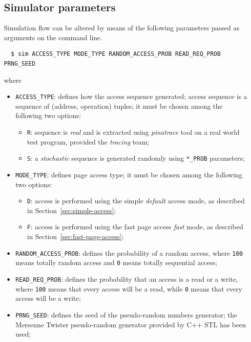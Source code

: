 \documentclass[a4paper,12pt]{article}
\begin{document}
\subsection{Simulator parameters}
Simulation flow can be altered by means of the following parameters passed as arguments on the command line.

\begin{verbatim}
  $ sim ACCESS_TYPE MODE_TYPE RANDOM_ACCESS_PROB READ_REQ_PROB PRNG_SEED
\end{verbatim}

where

\begin{itemize}
  \item \texttt{ACCESS\_TYPE}: defines how the access sequence generated; access sequence is a sequence of (address, operation) tuples; it must be chosen among the following two options:
  \begin{itemize}
    \item \texttt{R}: sequence is \emph{real} and is extracted using \emph{pinatrace} tool on a real world test program, provided the \emph{tracing} team;
    \item \texttt{S}: a \emph{stochastic} sequence is generated randomly using \texttt{*\_PROB} parameters;
  \end{itemize}
  \item \texttt{MODE\_TYPE}: defines page access type; it must be chosen among the following two options:
\begin{itemize}
  \item \texttt{D}: access is performed using the simple \emph{default} access mode, as described in Section~\ref{sec:simple-access};
  \item \texttt{F}: access is performed using the fast page access \emph{fast} mode, as described in Section~\ref{sec:fast-page-access};
\end{itemize}
  \item \texttt{RANDOM\_ACCESS\_PROB}: defines the probability of a random access, where \texttt{100} means totally random access and \texttt{0} means totally sequential access;
  \item \texttt{READ\_REQ\_PROB}: defines the probability that an access is a read or a write, where \texttt{100} means that every access will be a read, while \texttt{0} means that every access will be a write;
  \item \texttt{PRNG\_SEED}: defines the seed of the pseudo-random numbers generator; the Mersenne Twister pseudo-random generator provided by C++ STL has been used;
\end{itemize}
\end{document}
